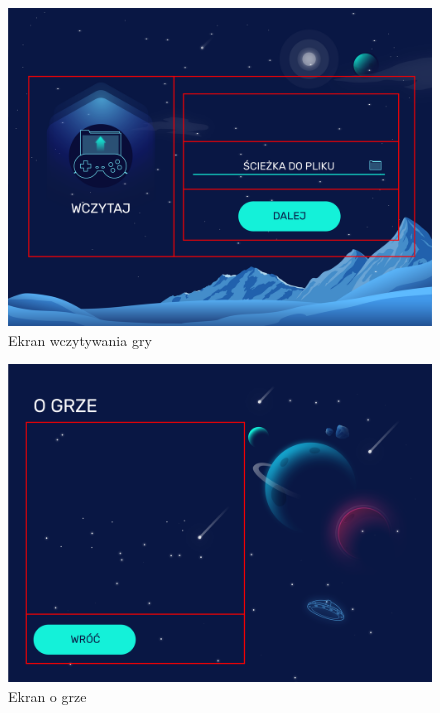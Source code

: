 \documentclass[a4paper]{article}
\begin{document}
\begin{figure}[H]
    \centering
    \includegraphics[width=1\textwidth]{img/ekran-wczytaj-grid.png}
    \caption{Ekran wczytywania gry}
    \label{fig:wczytaj}
\end{figure}

\begin{figure}[H]
    \centering
    \includegraphics[width=1\textwidth]{img/ekran-o-grze-grid.png}
    \caption{Ekran o grze}
    \label{fig:o grze}
\end{figure}
\end{document}
